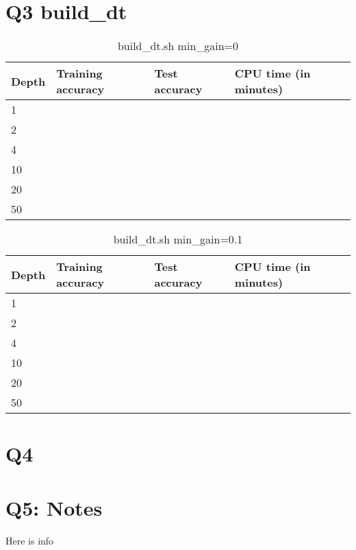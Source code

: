 \documentclass[11pt]{article}
\begin{document}
\section{ Q3 build\_dt} 
\begin{table}[hbtp]
\centering
\caption{build\_dt.sh min\_gain=0}
\label{table2}
\begin{tabular}{|l|l|l|l|} \hline
Depth   & Training accuracy & Test accuracy & CPU time (in minutes)\\ \hline
1       &  &  &  \\ \hline
2       &  &  &  \\ \hline
4       &  &  &  \\ \hline
10      &  &  &  \\ \hline
20      &  &  &  \\ \hline
50      &  &  &       \\ \hline
\end{tabular}
\end{table}
\begin{table}[hbtp]
\centering
\caption{build\_dt.sh min\_gain=0.1}
\label{table3}
\begin{tabular}{|l|l|l|l|} \hline
Depth   & Training accuracy & Test accuracy & CPU time (in minutes)\\ \hline
1       &  &  &  \\ \hline
2       &  &  &  \\ \hline
4       &  &  &  \\ \hline
10      &  &  &  \\ \hline
20      &  &  &  \\ \hline
50      &  &  &       \\ \hline
\end{tabular}
\end{table}
\section{ Q4}
\section{Q5: Notes}
Here is info
\end{document}
